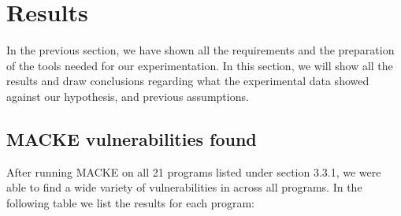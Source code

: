\section{Results}

In the previous section, we have shown all the requirements and the preparation of the tools needed for our experimentation. In this section, we will show all the results and draw conclusions regarding what the experimental data showed against our hypothesis, and previous assumptions. 

\subsection{MACKE vulnerabilities found}

After running MACKE on all 21 programs listed under section 3.3.1, we were able to find a wide variety of vulnerabilities in across all programs. In the following table we list the results for each program:

